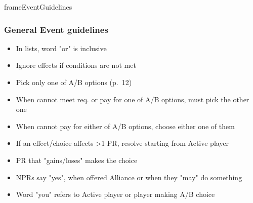 \documentclass[10pt]{article}
\newlength{\fhEventGuidelines} \setlength\fhEventGuidelines{34\baselineskip}
\begin{document}
\begin{dynamiccontents*}{frameEventGuidelines}\begin{eubox}{\fhEventGuidelines}
	\begin{multicols*}{2}
		\subsubsection*{General Event guidelines }
		\begin{itemize}
			\item In lists, word "or" is inclusive
			\item Ignore effects if conditions are not met
			\item Pick only one of A/B options (p.~12)
			\item When cannot meet req. or pay for one of A/B options, must pick the other one
			\item When cannot pay for either of A/B options, choose either one of them
			\item If an effect/choice affects >1 PR, resolve starting from Active player
			\item PR that "gains/loses" makes the choice
			\item NPRs say "yes", when offered Alliance or when they "may" do something
			\item Word "you" refers to Active player or player making A/B choice
		\end{itemize}
		

\end{multicols*}
\end{eubox}
\end{dynamiccontents*}
\end{document}
